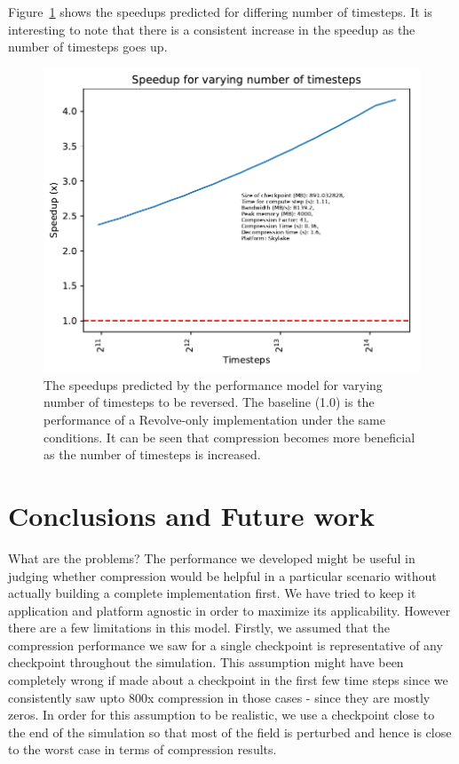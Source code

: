 \documentclass[conference]{IEEEtran}
\begin{document}
Figure~\ref{fig:varying_nt} shows the speedups predicted for differing
number of timesteps. It is interesting to note that there is a
consistent increase in the speedup as the number of timesteps goes
up. 
\begin{figure}
\begin{center}
\includegraphics[width=\linewidth]{images/varying-nt.pdf}
\end{center}
\caption{The speedups predicted by the performance model for varying
  number of timesteps to be reversed. The baseline
(1.0) is the performance of a Revolve-only implementation under the
same conditions. It can be seen that compression becomes more
beneficial as the number of timesteps is increased.}
\label{fig:varying_nt}
\end{figure}

\section{Conclusions and Future work}
What are the problems?
The performance we developed might be useful in judging whether compression
would be helpful in a particular scenario without actually building a
complete implementation first. We have tried to keep it application
and platform agnostic in order to maximize its applicability. However
there are a few limitations in this model. Firstly, we assumed that
the compression performance we saw for a single checkpoint is
representative of any checkpoint throughout the simulation. This
assumption might have been completely wrong if made about a checkpoint
in the first few time steps since we consistently saw upto 800x
compression in those cases - since they are mostly zeros. In order for
this assumption to be realistic, we use a checkpoint close to the end
of the simulation so that most of the field is perturbed and hence is
close to the worst case in terms of compression results. 
\end{document}
